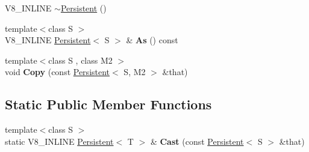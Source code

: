 \begin{DoxyCompactItemize}
\item 
V8\+\_\+\+I\+N\+L\+I\+NE \mbox{\hyperlink{classv8_1_1Persistent_a7d4d2bebfe3919e447e22adc15464e25}{$\sim$\+Persistent}} ()
\item 
\mbox{\label{classv8_1_1Persistent_a842282b8cb50699f99c5e415230926ee}} 
{\footnotesize template$<$class S $>$ }\\V8\+\_\+\+I\+N\+L\+I\+NE \mbox{\hyperlink{classv8_1_1Persistent}{Persistent}}$<$ S $>$ \& {\bfseries As} () const
\item 
\mbox{\label{classv8_1_1Persistent_ace50a178e3b772f75611e22e41fae974}} 
{\footnotesize template$<$class S , class M2 $>$ }\\void {\bfseries Copy} (const \mbox{\hyperlink{classv8_1_1Persistent}{Persistent}}$<$ S, M2 $>$ \&that)
\end{DoxyCompactItemize}
\subsection*{Static Public Member Functions}
\begin{DoxyCompactItemize}
\item 
\mbox{\label{classv8_1_1Persistent_aefcf5962630a14c198f466f64a685946}} 
{\footnotesize template$<$class S $>$ }\\static V8\+\_\+\+I\+N\+L\+I\+NE \mbox{\hyperlink{classv8_1_1Persistent}{Persistent}}$<$ T $>$ \& {\bfseries Cast} (const \mbox{\hyperlink{classv8_1_1Persistent}{Persistent}}$<$ S $>$ \&that)
\end{DoxyCompactItemize}
